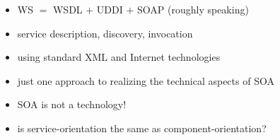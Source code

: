 \documentclass{sepslide-soa-faked} %
\begin{document}
\begin{slide}
\begin{itemize}
\item WS $=$ WSDL $+$ UDDI $+$ SOAP (roughly speaking)
\item service description, discovery, invocation
\item using standard XML and Internet technologies
\item just one approach to realizing the technical aspects of SOA
\item SOA is not a technology!
\bigskip
\item is service-orientation the same as component-orientation?
\end{itemize}
\end{slide}

\begin{slide}
  \Listofslides
\end{slide}

\begin{slide}
  \Timetable
\end{slide}
\end{document}
